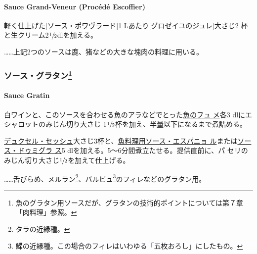 \hypertarget{sauce-grand-veneur-procede-escoffier}{%
\paragraph{Sauce Grand-Veneur (Procédé
Escoffier)}\label{sauce-grand-veneur-procede-escoffier}}


軽く仕上げた{[}ソース・ポワヴラード{]}1
Lあたり{[}グロゼイユのジュレ{]}大さじ2
杯と生クリーム2\(\sfrac{1}{2}\)dlを加える。

\ldots{}\ldots{}上記2つのソースは鹿、猪などの大きな塊肉の料理に用いる。

\maeaki

\hypertarget{ux30bdux30fcux30b9ux30b0ux30e9ux30bfux30f345}{%
\subsubsection[ソース・グラタン]{\texorpdfstring{ソース・グラタン\footnote{魚のグラタン用ソースだが、グラタンの技術的ポイントについては第７章「肉料理」参照。}}{ソース・グラタン}}\label{ux30bdux30fcux30b9ux30b0ux30e9ux30bfux30f345}}

\hypertarget{sauce-gratin}{%
\paragraph{Sauce Gratin}\label{sauce-gratin}}


白ワインと、このソースを合わせる魚のアラなどでとった\href{fumet-de-poisson}{魚のフュ
メ}各3 dlにエシャロットのみじん切り大さじ
1\(\sfrac{1}{2}\)杯を加え、半量以下になるまで煮詰める。

\href{}{デュクセル・セッシュ}大さじ3杯と、\protect\hyperlink{sauce-espagnole-maigre}{魚料理用ソース・エスパニョ
ル}または\protect\hyperlink{sauce-demi-glace}{ソース・ドゥミグラ ス}5
dlを加える。5〜6分間煮立たせる。提供直前に、パ
セリのみじん切り大さじ\(\sfrac{1}{2}\)を加えて仕上げる。

\ldots{}\ldots{}舌びらめ、メルラン\footnote{タラの近縁種。}、バルビュ\footnote{鰈の近縁種。この場合のフィレはいわゆる「五枚おろし」にしたもの。}のフィレなどのグラタン用。

